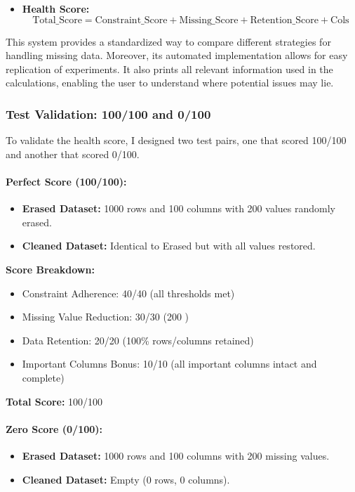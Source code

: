\documentclass[a4paper,12pt]{article}
\begin{document}
\begin{itemize}
  \item \textbf{Health Score:}
  \[
  \text{Total\_Score} = \text{Constraint\_Score} + \text{Missing\_Score} + \text{Retention\_Score} + \text{Cols}
  \]
\end{itemize}

This system provides a standardized way to compare different strategies for handling missing data. Moreover, its automated implementation allows for easy replication of experiments. It also prints all relevant information used in the calculations, enabling the user to understand where potential issues may lie.

\subsubsection{Test Validation: 100/100 and 0/100}

To validate the health score, I designed two test pairs, one that scored 100/100 and another that scored 0/100.

\paragraph{Perfect Score (100/100):}
\begin{itemize}
    \item \textbf{Erased Dataset:} 1000 rows and 100 columns with 200 values randomly erased.
    \item \textbf{Cleaned Dataset:} Identical to Erased but with all values restored.
\end{itemize}

\textbf{Score Breakdown:}
\begin{itemize}
    \item Constraint Adherence: 40/40 (all thresholds met)
    \item Missing Value Reduction: 30/30 (200 )
    \item Data Retention: 20/20 (100\% rows/columns retained)
    \item Important Columns Bonus: 10/10 (all important columns intact and complete)
\end{itemize}

\textbf{Total Score:} 100/100

\paragraph{Zero Score (0/100):}
\begin{itemize}
    \item \textbf{Erased Dataset:} 1000 rows and 100 columns with 200 missing values.
    \item \textbf{Cleaned Dataset:} Empty (0 rows, 0 columns).
\end{itemize}
\end{document}
